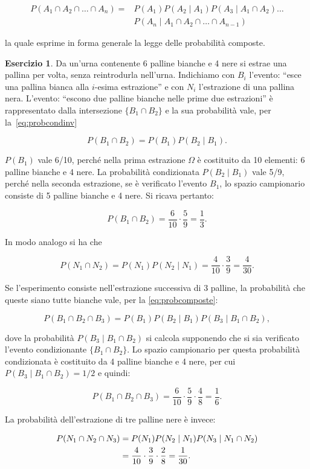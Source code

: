 \documentclass[
  11pt,
]{krantz}
\theoremstyle{definition}
\theoremstyle{definition}
\theoremstyle{definition}
\newtheorem{exercise}{Esercizio}[chapter]
\theoremstyle{definition}
\theoremstyle{remark}
\begin{document}
\begin{equation}
\begin{split}
P(A_1 \cap A_2 \cap \dots\cap A_n) = {}& P(A_1)P(A_2 \mid A_1)P(A_3 \mid A_1 \cap A_2) \dots\\
 & P(A_n \mid A_1 \cap A_2 \cap \dots \cap A_{n-1})
\end{split}
\label{eq:probcomposte}
\end{equation}

la quale esprime in forma generale la legge delle probabilità composte.

\begin{exercise}
Da un'urna contenente 6 palline bianche e 4 nere si estrae una pallina per volta, senza reintrodurla nell'urna. Indichiamo con \(B_i\) l'evento: ``esce una pallina bianca alla \(i\)-esima estrazione'' e con \(N_i\) l'estrazione di una pallina nera. L'evento: ``escono due palline bianche nelle prime due estrazioni'' è rappresentato dalla intersezione \(\{B_1 \cap B_2\}\) e la sua probabilità vale, per la~\eqref{eq:probcondinv}

\[
P(B_1 \cap B_2) = P(B_1)P(B_2 \mid B_1).
\]

\(P(B_1)\) vale 6/10, perché nella prima estrazione \(\Omega\) è costituito da 10 elementi: 6 palline bianche e 4 nere. La probabilità condizionata \(P(B_2 \mid B_1)\) vale 5/9, perché nella seconda estrazione, se è verificato l'evento \(B_1\), lo spazio campionario consiste di 5 palline bianche e 4 nere. Si ricava pertanto:

\[
P(B_1 \cap B_2) = \frac{6}{10} \cdot \frac{5}{9} = \frac{1}{3}.
\]

In modo analogo si ha che

\[
P(N_1 \cap N_2) = P(N_1)P(N_2 \mid N_1) = \frac{4}{10} \cdot \frac{3}{9} = \frac{4}{30}.
\]

Se l'esperimento consiste nell'estrazione successiva di 3 palline, la probabilità che queste siano tutte bianche vale, per la \eqref{eq:probcomposte}:

\[
P(B_1 \cap B_2 \cap B_3)=P(B_1)P(B_2 \mid B_1)P(B_3 \mid B_1 \cap B_2),
\]

dove la probabilità \(P(B_3 \mid B_1 \cap B_2)\) si calcola supponendo che si sia verificato l'evento condizionante \(\{B_1 \cap B_2\}\). Lo spazio campionario per questa probabilità condizionata è costituito da 4 palline bianche e 4 nere, per cui \(P(B_3 \mid B_1 \cap B_2) = 1/2\) e quindi:

\[
P (B_1 \cap B_2 \cap B_3) = \frac{6}{10}\cdot\frac{5}{9} \cdot\frac{4}{8}  = \frac{1}{6}.
\]

La probabilità dell'estrazione di tre palline nere è invece:

\[
\begin{aligned}
P(N_1 \cap N_2 \cap N_3) &= P(N_1)P(N_2 \mid N_1)P(N_3 \mid N_1 \cap N_2)\notag\\ 
&= \frac{4}{10} \cdot \frac{3}{9} \cdot \frac{2}{8} = \frac{1}{30}.\notag
\end{aligned}
\]
\end{exercise}
\end{document}
